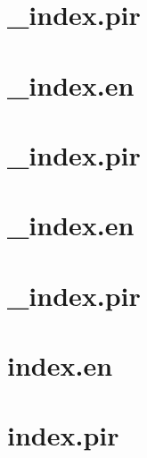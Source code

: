\let\mypdfximage\pdfximage\def\pdfximage{\immediate\mypdfximage}\documentclass[twoside]{book}
\newcommand{\+}{\discretionary{\mbox{\scriptsize$\hookleftarrow$}}{}{}}
\begin{document}
\chapter{\+\_\+index.\+pir}
\label{md_themes_relearn_exampleSite_content_more__index_pir}

\chapter{\+\_\+index.\+en}
\label{md_themes_relearn_exampleSite_content_more_credits__index_en}

\chapter{\+\_\+index.\+pir}
\label{md_themes_relearn_exampleSite_content_more_credits__index_pir}

\chapter{\+\_\+index.\+en}
\label{md_themes_relearn_exampleSite_content_shortcodes__index_en}

\chapter{\+\_\+index.\+pir}
\label{md_themes_relearn_exampleSite_content_shortcodes__index_pir}

\chapter{index.\+en}
\label{md_themes_relearn_exampleSite_content_shortcodes_attachments_index_en}

\chapter{index.\+pir}
\label{md_themes_relearn_exampleSite_content_shortcodes_attachments_index_pir}

\end{document}
